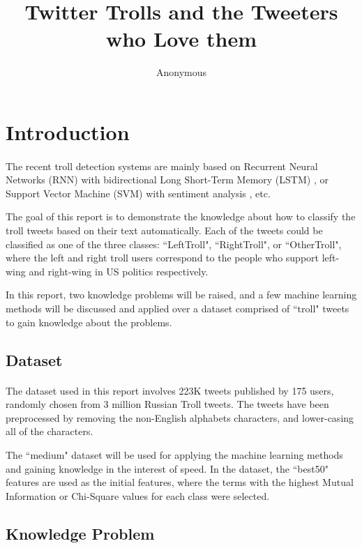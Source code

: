 \documentclass[11pt]{article}
\title{Twitter Trolls and the Tweeters who Love them}
\author
{Anonymous}
\begin{document}
\maketitle

\section{Introduction}

\paragraph{} The recent troll detection systems are mainly based on Recurrent Neural Networks (RNN) with bidirectional Long Short-Term Memory (LSTM) \cite{cuestadetecting}, or Support Vector Machine (SVM) with sentiment analysis \cite{seah2015troll}, etc.

The goal of this report is to demonstrate the knowledge about how to classify the troll tweets based on their text automatically. Each of the tweets could be classified as one of the three classes: ``LeftTroll", ``RightTroll", or ``OtherTroll", where the left and right troll users correspond to the people who support left-wing and right-wing in US politics respectively.

In this report, two knowledge problems will be raised, and a few machine learning methods will be discussed and applied over a dataset comprised of ``troll" tweets to gain knowledge about the problems.

\subsection{Dataset}
\paragraph{}
The dataset used in this report involves 223K tweets published by 175 users, randomly chosen from 3 million Russian Troll tweets. \cite{boatwrighttroll} The tweets have been preprocessed by removing the non-English alphabets characters, and lower-casing all of the characters.

The ``medium" dataset will be used for applying the machine learning methods and gaining knowledge in the interest of speed. In the dataset, the ``best50" features are used as the initial features, where the terms with the highest Mutual Information or Chi-Square values for each class were selected.

\subsection{Knowledge Problem}
\end{document}
